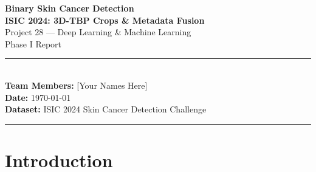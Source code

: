 \documentclass[12pt, a4paper]{article}
\begin{document}
\begin{titlepage}
    \centering
    \vspace*{2cm}
    {\Huge\bfseries Binary Skin Cancer Detection\\[0.5em]
     \large ISIC 2024: 3D-TBP Crops \& Metadata Fusion}\\[2em]

    {\Large Project 28 — Deep Learning \& Machine Learning}\\[1em]
    {\large Phase I Report}\\[2em]

    \rule{\linewidth}{0.4pt}\\[1.5em]
    {\large \textbf{Team Members:} [Your Names Here]}\\[0.5em]
    {\large \textbf{Date:} \today}\\[0.5em]
    {\large \textbf{Dataset:} ISIC 2024 Skin Cancer Detection Challenge}\\[1em]
    \rule{\linewidth}{0.4pt}

    \vfill
    \begin{abstract}
        \noindent
        Population-scale skin cancer screening demands AI systems that are accurate,
        calibrated, and clinically reliable. We develop and evaluate four approaches
        to binary malignancy detection on the ISIC 2024 SLICE-3D dataset:
        (1) a metadata-only LightGBM baseline,
        (2) classical computer vision feature extraction,
        (3) an EfficientNet-B4 deep learning classifier with Focal Loss, and
        (4) a hybrid fusion model combining visual and clinical information with
        temperature-scaled probability calibration.
        All models are evaluated using partial AUC at TPR~$\geq$~0.80,
        reflecting the clinical requirement to maintain high sensitivity.
        \textbf{Our best model achieves pAUC = [TBD] on held-out validation},
        compared to [TBD] for the metadata-only baseline.
    \end{abstract}
\end{titlepage}

\tableofcontents
\newpage

\section{Introduction}
\label{sec:intro}
\end{document}

